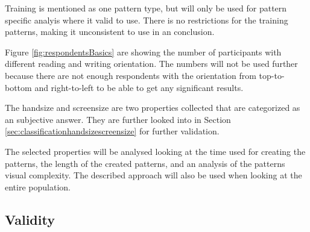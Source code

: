     Training is mentioned as one pattern type, but will only be used for pattern specific analyis where it valid to use. There is no restrictions for the training patterns, making it unconsistent to use in an conclusion. 

    Figure \ref{fig:respondentsBasics} are showing the number of participants with different reading and writing orientation. The numbers will not be used further because there are not enough respondents with the orientation from top-to-bottom and right-to-left to be able to get any significant results.

    The handsize and screensize are two properties collected that are categorized as an subjective answer. They are further looked into in Section \ref{sec:classificationhandsizescreensize} for further validation.     

    The selected properties will be analysed looking at the time used for creating the patterns, the length of the created patterns, and an analysis of the patterns visual complexity. The described approach will also be used when looking at the entire population. 

    \subsection{Validity}

